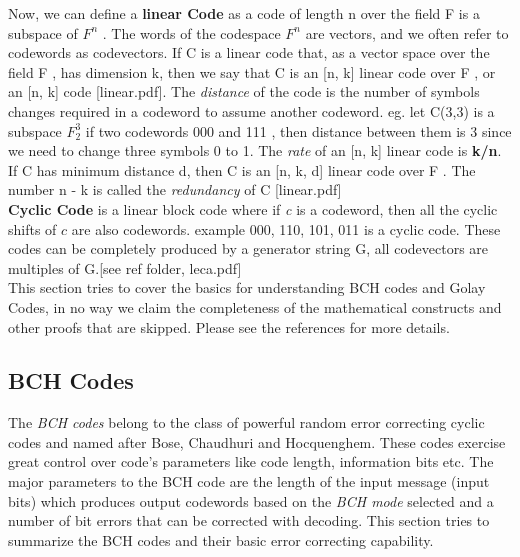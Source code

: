 Now, we can define a \textbf{linear Code} as a code of length n over the field F is a subspace of $F^n$ . The words of the codespace $F^n$ are vectors, and we often refer to codewords as codevectors.
If C is a linear code that, as a vector space over the field F , has dimension k,
then we say that C is an [n, k] linear code over F , or an [n, k] code [linear.pdf]. The \emph{distance} of the code is the number of symbols changes required in a codeword to assume another codeword. eg. let C(3,3) is a subspace $F_2^3$ if two codewords 000 and 111 , then distance between them is 3 since we need to change three symbols 0 to 1.
The \emph{rate} of an [n, k] linear code is \textbf{k/n}. If C has minimum distance d, then C is an [n, k, d] linear code over F .
The number n - k is called the \emph{redundancy} of C [linear.pdf]\\

\textbf{Cyclic Code} is a linear block code where if \emph{c} is a codeword, then all the cyclic shifts of $c$ are also codewords.
example {000, 110, 101, 011} is a cyclic code.
These codes can be completely produced by a generator string G, all codevectors are multiples of G.[see ref folder, leca.pdf]\\

This section tries to cover the basics for understanding BCH codes and Golay Codes, in no way we claim the completeness of the mathematical constructs and other proofs that are skipped. Please see the references for more details.\\

\subsection{BCH Codes}
\label{bch_section}
The \emph{BCH codes} belong to the class of powerful random error correcting cyclic codes and named after Bose, Chaudhuri and Hocquenghem. These codes exercise great control over code's parameters like code length, information bits etc. The major parameters to the BCH code are the length of the input message (input bits) which produces output codewords based on the \emph{BCH mode} selected and a number of bit errors that can be corrected with decoding. This section tries to summarize the BCH codes and
their basic error correcting capability.\\

